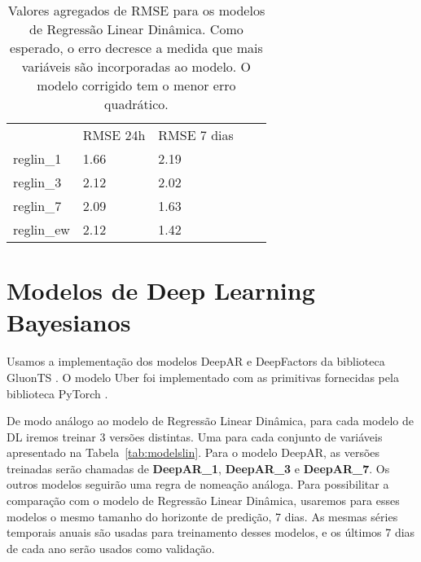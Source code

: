 \begin{center}
  \begin{table}[]
    \centering
    \begin{tabular}{l|llll}
      \cline{2-3}
      & \multicolumn{1}{l|}{RMSE 24h} & \multicolumn{1}{l|}{RMSE 7 dias} &  \\ \cline{1-3}
      \multicolumn{1}{|l|}{reglin\_1} & 1.66                          & 2.19                             &  \\ \cline{1-1}
      \multicolumn{1}{|l|}{reglin\_3} & 2.12                          & 2.02                             &  \\ \cline{1-1}
      \multicolumn{1}{|l|}{reglin\_7} & 2.09                          & 1.63                             &  \\ \cline{1-1}
      \multicolumn{1}{|l|}{reglin\_ew} & 2.12                          & 1.42                            &  \\ \cline{1-1}
    \end{tabular}
    \caption{Valores agregados de RMSE para os modelos de Regressão Linear
      Dinâmica. Como esperado, o erro decresce a medida que mais variáveis são
      incorporadas ao modelo. O modelo corrigido tem o menor erro quadrático.}

    \label{tb:rmse_exp}
  \end{table}
\end{center}



\section{Modelos de Deep Learning Bayesianos}


Usamos a implementação dos modelos DeepAR e DeepFactors da biblioteca GluonTS
\citep{gluonts}. O modelo Uber foi implementado com as primitivas fornecidas
pela biblioteca PyTorch \citep{pytorch}.

De modo análogo ao modelo de Regressão Linear Dinâmica, para
cada modelo de DL iremos treinar 3 versões distintas. Uma para cada conjunto de
variáveis apresentado na Tabela~\ref{tab:modelslin}. Para o modelo DeepAR, as versões treinadas serão chamadas de \textbf{DeepAR\_1},
\textbf{DeepAR\_3} e \textbf{DeepAR\_7}. Os outros modelos seguirão uma
regra de nomeação análoga. Para possibilitar a comparação com o modelo de Regressão Linear Dinâmica, usaremos para esses modelos o mesmo
tamanho do horizonte de predição, 7 dias. As mesmas séries temporais anuais são
usadas para treinamento desses modelos, e os últimos 7 dias de cada ano serão
usados como validação.

